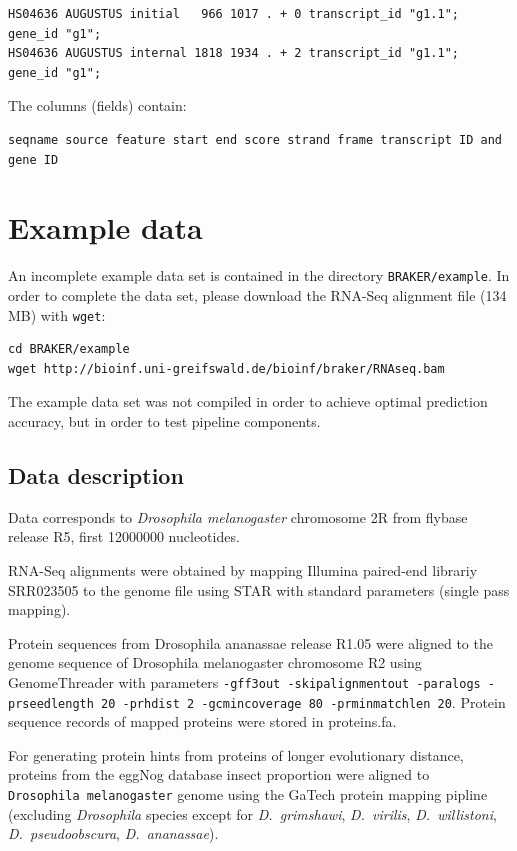 \documentclass[]{article}
\begin{document}
\begin{verbatim}
HS04636 AUGUSTUS initial   966 1017 . + 0 transcript_id "g1.1"; gene_id "g1";
HS04636 AUGUSTUS internal 1818 1934 . + 2 transcript_id "g1.1"; gene_id "g1";
\end{verbatim}

The columns (fields) contain:

\begin{verbatim}
seqname source feature start end score strand frame transcript ID and gene ID
\end{verbatim}

\hypertarget{example-data}{\section{Example data}\label{example-data}}

An incomplete example data set is contained in the directory
\texttt{BRAKER/example}. In order to complete the data set, please
download the RNA-Seq alignment file (134 MB) with \texttt{wget}:

\begin{verbatim}
cd BRAKER/example
wget http://bioinf.uni-greifswald.de/bioinf/braker/RNAseq.bam
\end{verbatim}

The example data set was not compiled in order to achieve optimal
prediction accuracy, but in order to test pipeline components.

\hypertarget{data-description}{\subsection{Data
description}\label{data-description}}

Data corresponds to \emph{Drosophila melanogaster} chromosome 2R from
flybase release R5, first 12000000 nucleotides.

RNA-Seq alignments were obtained by mapping Illumina paired-end librariy
SRR023505 to the genome file using STAR with standard parameters (single
pass mapping).

Protein sequences from Drosophila ananassae release R1.05 were aligned
to the genome sequence of Drosophila melanogaster chromosome R2 using
GenomeThreader with parameters
\texttt{-gff3out\ -skipalignmentout\ -paralogs\ -prseedlength\ 20\ -prhdist\ 2\ -gcmincoverage\ 80\ -prminmatchlen\ 20}.
Protein sequence records of mapped proteins were stored in proteins.fa.

For generating protein hints from proteins of longer evolutionary
distance, proteins from the eggNog database insect proportion were
aligned to \texttt{Drosophila\ melanogaster} genome using the GaTech
protein mapping pipline (excluding \emph{Drosophila} species except for
\emph{D.~grimshawi}, \emph{D.~virilis}, \emph{D.~willistoni},
\emph{D.~pseudoobscura}, \emph{D.~ananassae}).
\end{document}
